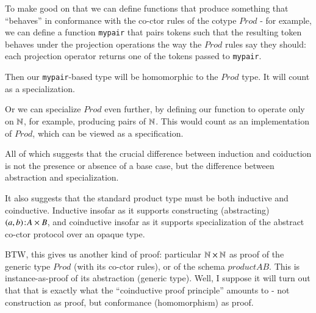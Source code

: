 To make good on that we can define functions that produce something
that ``behaves'' in conformance with the co-ctor rules of the cotype
\(Prod\) - for example, we can define a function \texttt{mypair} that
pairs tokens such that the resulting token behaves under the
projection operations the way the \(Prod\) rules say they should: each
projection operator returns one of the tokens passed to
\texttt{mypair}.

Then our \texttt{mypair}-based type will be homomorphic to the
\(Prod\) type. It will count as a specialization.

Or we can specialize \(Prod\) even further, by defining our function
to operate only on \(\mathbb{N}\), for example, producing pairs of \(\mathbb{N}\).
This would count as an implementation of \(Prod\), which can be viewed
as a specification.

All of which suggests that the crucial difference between induction
and coiduction is not the presence or absence of a base case, but the
difference between abstraction and specialization.

It also suggests that the standard product type must be both inductive
and coinductive. Inductive insofar as it supports constructing
(abstracting) \((a,b)\hspace{1pt}\mathpunct{:}\hspace{-1pt}A\times{}B\), and coinductive insofar
as it supports specialization of the abstract co-ctor protocol over an
opaque type.

BTW, this gives us another kind of proof: particular
\(\mathbb{N}\times{}\mathbb{N}\) as proof of the generic type \(Prod\) (with
its co-ctor rules), or of the schema \(product{A}{B}\). This is
instance-as-proof of its abstraction (generic type). Well, I suppose
it will turn out that that is exactly what the ``coinductive proof
principle'' amounts to - not construction as proof, but conformance
(homomorphism) as proof.
